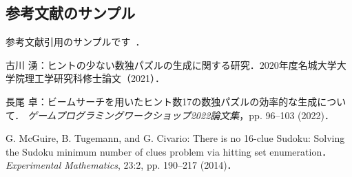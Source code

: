 \documentclass[a4paper, 9pt]{jarticle}
\begin{document}
\begin{論文概要}
\subsection{参考文献のサンプル}
参考文献引用のサンプルです~\cite{paper1}\cite{paper2}．


\begin{thebibliography}{10}

  古川 湧：ヒントの少ない数独パズルの生成に関する研究．$2020$年度名城大学大学院理工学研究科修士論文（2021）．
  
  長尾 卓：ビームサーチを用いたヒント数17の数独パズルの効率的な生成について．
  {\it ゲームプログラミングワークショップ2022論文集}，pp. 96--103 (2022)．
  
  G. McGuire, B. Tugemann, and G. Civario:
  There is no 16-clue Sudoku: Solving the Sudoku minimum number of clues problem via hitting set enumeration．
  {\it Experimental Mathematics}, 23:2, pp. 190--217 (2014)．
  
  
  
  
\end{thebibliography}

\end{論文概要} %
\end{document}
